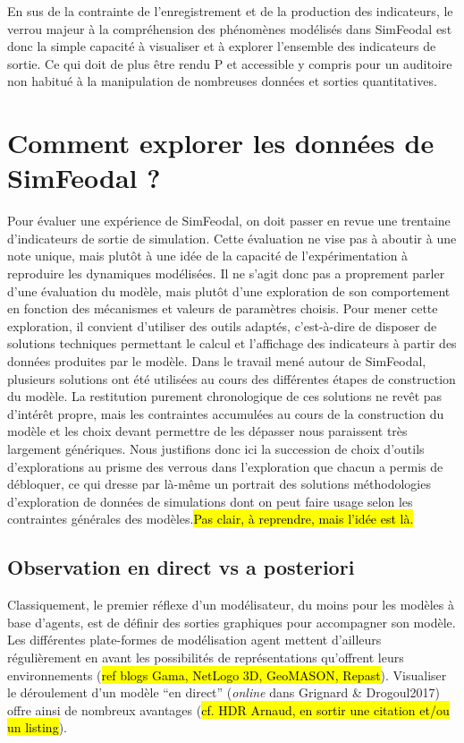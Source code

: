 	En sus de la contrainte de l'enregistrement et de la production des indicateurs, le verrou majeur à la compréhension des phénomènes modélisés dans SimFeodal est donc la simple capacité à visualiser et à explorer l'ensemble des indicateurs de sortie.
	Ce qui doit de plus être rendu P et accessible y compris pour un auditoire non habitué à la manipulation de nombreuses données et sorties quantitatives.
	
\clearpage
\section{Comment explorer les données de SimFeodal ?}

	Pour évaluer une expérience de SimFeodal, on doit passer en revue une trentaine d'indicateurs de sortie de simulation.
	Cette évaluation ne vise pas à aboutir à une note unique, mais plutôt à une idée de la capacité de l'expérimentation à reproduire les dynamiques modélisées.
	Il ne s'agit donc pas a proprement parler d'une évaluation du modèle, mais plutôt d'une exploration de son comportement en fonction des mécanismes et valeurs de paramètres choisis.
	Pour mener cette exploration, il convient d'utiliser des outils adaptés, c'est-à-dire de disposer de solutions techniques permettant le calcul et l'affichage des indicateurs à partir des données produites par le modèle.
	Dans le travail mené autour de SimFeodal, plusieurs solutions ont été utilisées au cours des différentes étapes de construction du modèle.
	La restitution purement chronologique de ces solutions ne revêt pas d'intérêt propre, mais les contraintes accumulées au cours de la construction du modèle et les choix devant permettre de les dépasser nous paraissent très largement génériques.
	Nous justifions donc ici la succession de choix d'outils d'explorations au prisme des verrous dans l'exploration que chacun a permis de débloquer, ce qui dresse par là-même un portrait des solutions méthodologies d'exploration de données de simulations dont on peut faire usage selon les contraintes générales des modèles.\hl{Pas clair, à reprendre, mais l'idée est là.}
	
	\subsection{Observation en direct vs a posteriori}

	Classiquement, le premier réflexe d'un modélisateur, du moins pour les modèles à base d'agents, est de définir des sorties graphiques pour accompagner son modèle.
	Les différentes plate-formes de modélisation agent mettent d'ailleurs régulièrement en avant les possibilités de représentations qu'offrent leurs environnements (\hl{ref blogs Gama, NetLogo 3D, GeoMASON, Repast}).
	Visualiser le déroulement d'un modèle ``en direct'' (\textit{online} dans Grignard \& Drogoul2017) offre ainsi de nombreux avantages (\hl{cf. HDR Arnaud, en sortir une citation et/ou un listing}).

